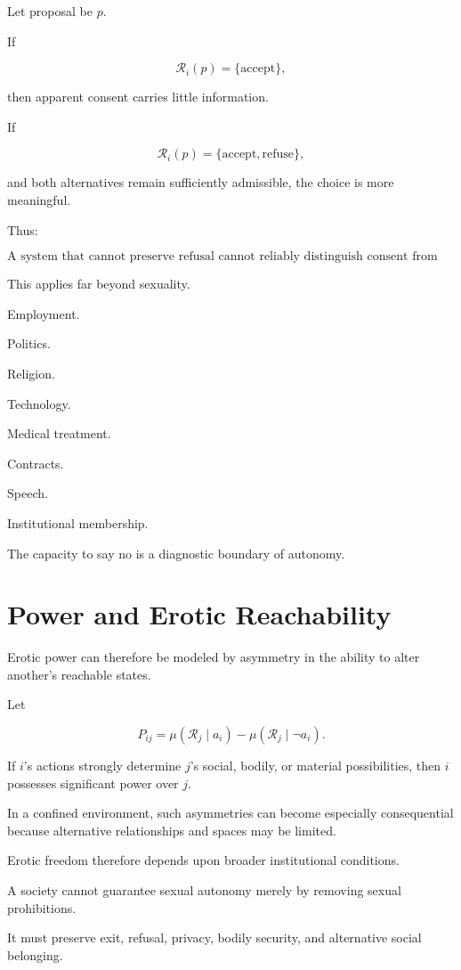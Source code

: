 \documentclass[11pt,oneside]{book}
\theoremstyle{definition}
\theoremstyle{remark}
\newcommand{\R}{\mathcal{R}}
\begin{document}
Let proposal be \(p\).

If

\[
\R_i(p)
=
\{\text{accept}\},
\]

then apparent consent carries little information.

If

\[
\R_i(p)
=
\{\text{accept},\text{refuse}\},
\]

and both alternatives remain sufficiently admissible, the choice is more meaningful.

Thus:

\[
\boxed{
\text{A system that cannot preserve refusal cannot reliably distinguish consent from compliance.}
}
\]

This applies far beyond sexuality.

Employment.

Politics.

Religion.

Technology.

Medical treatment.

Contracts.

Speech.

Institutional membership.

The capacity to say no is a diagnostic boundary of autonomy.

\section{Power and Erotic Reachability}

Erotic power can therefore be modeled by asymmetry in the ability to alter another's reachable states.

Let

\[
P_{ij}
=
\mu
\left(
\R_j\mid a_i
\right)
-
\mu
\left(
\R_j\mid \neg a_i
\right).
\]

If \(i\)'s actions strongly determine \(j\)'s social, bodily, or material possibilities, then \(i\) possesses significant power over \(j\).

In a confined environment, such asymmetries can become especially consequential because alternative relationships and spaces may be limited.

Erotic freedom therefore depends upon broader institutional conditions.

A society cannot guarantee sexual autonomy merely by removing sexual prohibitions.

It must preserve exit, refusal, privacy, bodily security, and alternative social belonging.
\end{document}
